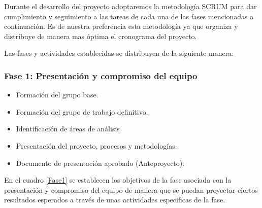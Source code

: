 Durante el desarrollo del proyecto adoptaremos la metodología SCRUM para dar cumplimiento y seguimiento a las tareas de cada una de las fases mencionadas a continuación. Es de nuestra preferencia esta metodología ya que organiza y distribuye de manera mas óptima el cronograma del proyecto.

Las fases y actividades establecidas se distribuyen de la siguiente manera:

\subsubsection{Fase 1: Presentación y compromiso del equipo}


\begin{itemize}
    \item Formación del grupo base.
    \item Formación del grupo de trabajo definitivo.
    \item Identificación de áreas de análisis
    \item Presentación del proyecto, procesos y metodologías.
    \item Documento de presentación aprobado (Anteproyecto).
\end{itemize}

En el cuadro \ref{Fase1} se establecen los objetivos de la fase asociada con la presentación y compromiso del equipo de manera que se puedan proyectar ciertos resultados esperados a través de unas actividades especificas de la fase.

